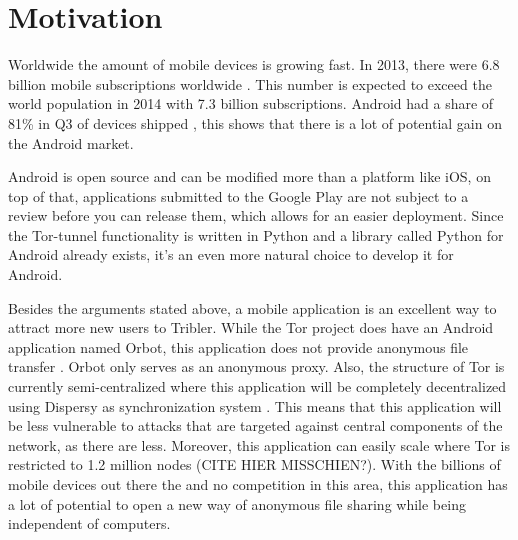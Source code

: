 \section{Motivation}
	Worldwide the amount of mobile devices is growing fast. In 2013, there were 6.8 billion mobile subscriptions worldwide \cite{itustatistics}. This number is expected to exceed the world population in 2014 with 7.3 billion subscriptions. Android had a share of 81\% in Q3 of devices shipped \cite{forbesandroidmarket}, this shows that there is a lot of potential gain on the Android market. 
	
	Android is open source and can be modified more than a platform like iOS, on top of that, applications submitted to the Google Play are not subject to a review before you can release them, which allows for an easier deployment. Since the Tor-tunnel functionality is written in Python and a library called Python for Android already exists, it's an even more natural choice to develop it for Android.

	Besides the arguments stated above, a mobile application is an excellent way to attract more new users to Tribler. While the Tor project does have an Android application named Orbot, this application does not provide anonymous file transfer \cite{tororbot, googleplayorbot}. Orbot only serves as an anonymous proxy. Also, the structure of Tor is currently semi-centralized \cite{jagerman2014fifteen} where this application will be completely decentralized using Dispersy as synchronization system \cite{zeilemaker2013dispersy}. This means that this application will be less vulnerable to attacks that are targeted against central components of the network, as there are less. Moreover, this application can easily scale where Tor is restricted to 1.2 million nodes (CITE HIER MISSCHIEN?). With the billions of mobile devices out there the and no competition in this area, this application has a lot of potential to open a new way of anonymous file sharing while being independent of computers.
	
